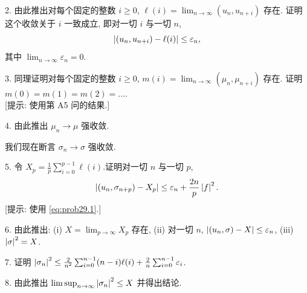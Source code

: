 \begin{problem}
2. 由此推出对每个固定的整数 $i\ge0$, $\ell(i)=\lim_{n\to\infty}(u_n,u_{n+i})$ 存在.
证明这个收敛关于 $i$ 一致成立, 即对一切 $i$ 与一切 $n$,
\begin{equation}
\left|(u_n,u_{n+i})-\ell(i)\right|\le\varepsilon_n,
\label{eq:prob29.1}
\end{equation}
其中 $\lim_{n\to\infty}\varepsilon_n=0$.

3. 同理证明对每个固定的整数 $i\ge0$, $m(i)=\lim_{n\to\infty}(\mu_n,\mu_{n+i})$ 存在.
证明 $m(0)=m(1)=m(2)=\dots$.\\
{[提示: 使用第 A5 问的结果.]}

4. 由此推出 $\mu_n\to\mu$ 强收敛.

我们现在断言 $\sigma_n\to\sigma$ 强收敛.

5. 令 $X_p=\frac1p\sum_{i=0}^{p-1}\ell(i)$.证明对一切 $n$ 与一切 $p$,
\begin{equation*}
\left|(u_n,\sigma_{n+p})-X_p\right|\le\varepsilon_n+\frac{2n}{p}\left|f\right|^2.
\end{equation*}
[提示: 使用 \eqref{eq:prob29.1}.]

6. 由此推出: (i) $X=\lim_{p\to\infty}X_p$ 存在, (ii) 对一切 $n$, $\left|(u_n,\sigma)-X\right|\le\varepsilon_n$,
(iii) $\left|\sigma\right|^2=X$.

7. 证明 $\left|\sigma_n\right|^2\le\frac{2}{n^2}\sum_{i=0}^{n-1}(n-i)\ell(i)+\frac2n\sum_{i=0}^{n-1}\varepsilon_i$.

8. 由此推出 $\limsup_{n\to\infty}\left|\sigma_n\right|^2\le X$ 并得出结论.
\end{problem}

